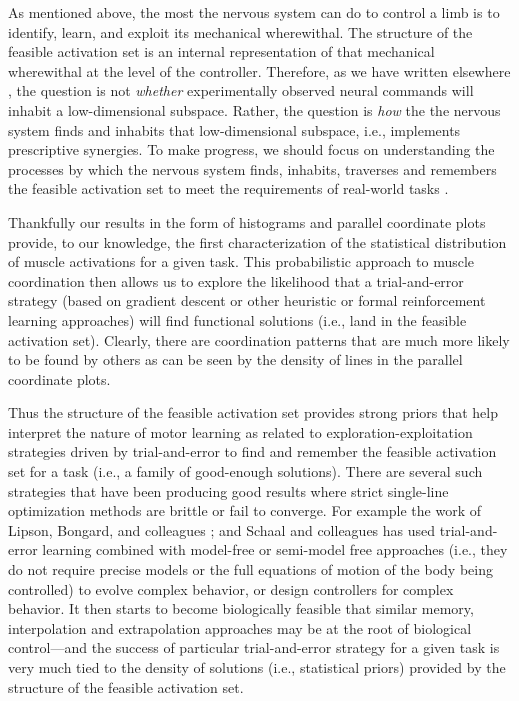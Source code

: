 \documentclass[10pt,letterpaper]{article}
\begin{document}
As mentioned above, the most the nervous system can do to control a limb is  to identify, learn, and exploit its mechanical wherewithal. The structure of the feasible activation set is an internal representation of that mechanical wherewithal at the level of the controller. Therefore, as we have written elsewhere \cite{valero-cuevas2015fundamentals,kutch2012challenges}, the question is not \emph{whether} experimentally observed neural commands will inhabit a low-dimensional subspace. Rather, the question is \emph{how}  the the nervous system finds and inhabits that low-dimensional subspace, i.e., implements prescriptive synergies. To make progress, we should focus on understanding the  processes by which the nervous system finds, inhabits, traverses and remembers the feasible activation set to meet the requirements of real-world tasks   \cite{racz2013spatiotemporal,dingwell2010walkingvariability,Keenan2009Maximal,Venkadesan2008Neural,giszter2015motor}.  

Thankfully our results in the form of histograms and parallel coordinate plots provide, to our knowledge, the first characterization of the statistical distribution of muscle activations for a given task. This probabilistic approach to muscle coordination then allows us to explore the likelihood that a trial-and-error strategy (based on gradient descent or other heuristic or formal reinforcement learning approaches) will find functional solutions (i.e., land in the feasible activation set). Clearly, there are coordination patterns that are  much more likely to be found by others as can be seen by the density of lines in the parallel coordinate plots.

Thus the structure of the feasible activation set provides strong priors that help interpret the nature  of motor learning as related to  exploration-exploitation  strategies driven by  trial-and-error to find and remember the feasible activation set for a task (i.e., a family of good-enough solutions). There are several such strategies that have been producing good results where strict single-line optimization methods are brittle or fail to converge. For example the work of Lipson, Bongard, and colleagues \cite{bongard2006Resilient,lipson2000automatic,Rieffel2009Morphological}; and Schaal and colleagues \cite{theodorou2011ACC_finger_OC,theodorou2010PiSquared,kalakrishnan2011littleDog} has used  trial-and-error learning combined with model-free or semi-model free approaches (i.e., they do not require precise models or the full equations of motion of the body being controlled) to evolve complex behavior, or design controllers for complex behavior.   It then starts to become biologically feasible that similar memory, interpolation and extrapolation approaches may be at the root of  biological control---and the success of particular trial-and-error strategy for a given task is very much tied to the  density of solutions (i.e., statistical priors) provided by the structure of the feasible activation set.
\end{document}
